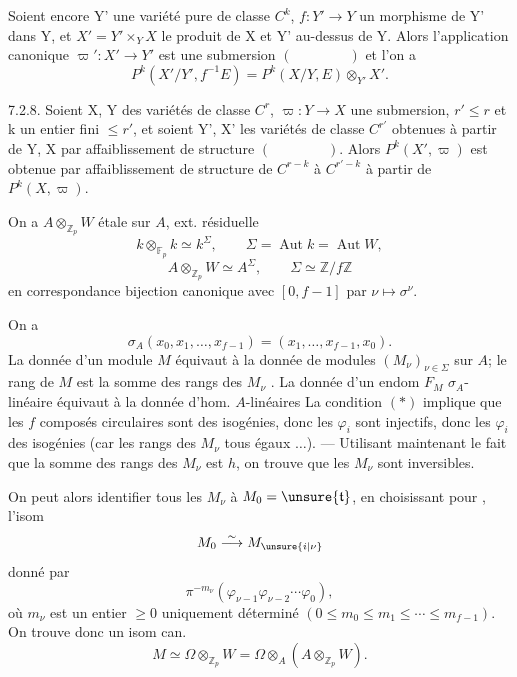 Soient encore Y' une variété pure de classe $C^k$, $f:Y'\longrightarrow Y$ un morphisme de Y' dans Y, et $X'=Y'\times_Y X$ le produit de X et Y' au-dessus de Y. Alors l'application canonique $\varpi':X'\longrightarrow Y'$ est une submersion $(\qquad\qquad)$ et l'on a
\[
P^k(X'/Y',f^{-1}E)=P^k(X/Y,E)\otimes_{Y'}X'.
\]

7.2.8. Soient X, Y des variétés de classe $C^r$, $\varpi:Y\longrightarrow X$ une submersion, $r'\leq r$ et k un entier fini $\leq r'$, et soient Y', X' les variétés de classe $C^{r'}$ obtenues à partir de Y, X par affaiblissement de structure $(\qquad\qquad)$. Alors $P^k(X',\varpi)$ est obtenue par affaiblissement de structure de $C^{r-k}$ à $C^{r'-k}$ à partir de $P^k(X,\varpi)$.

On a $A\otimes_{\mathbb Z_p}W$ étale sur $A$, ext. résiduelle
\[
k\otimes_{\mathbb F_p}k\simeq k^\Sigma,\qquad\Sigma=\operatorname{Aut}k=\operatorname{Aut}W,
\]
\[
A\otimes_{\mathbb Z_p}W\simeq A^\Sigma,\qquad \Sigma\simeq\mathbb Z/f\mathbb Z
\]
en correspondance bijection canonique avec $[0,f-1]$ par $\nu\mapsto\sigma^\nu$\quad{}.

On a
\[
\sigma_A(x_0,x_1,\ldots,x_{f-1})=(x_1,\ldots,x_{f-1},x_0).
\]
La donnée d'un module  $M$  équivaut à la donnée de modules $(M_\nu)_{\nu\in\Sigma}$ sur $A$; le rang de $M$ est la somme des rangs des $M_\nu$ . La donnée d'un endom $F_M$ $\sigma_A$-linéaire équivaut à la donnée d'hom. $A$-linéaires
La condition $(*)$  implique que les $f$ composés circulaires sont des isogénies, donc les $\varphi_i$ sont injectifs, donc les $\varphi_i$ des isogénies (car les rangs des $M_\nu$ tous égaux $\ldots$).  --- Utilisant maintenant le fait que la somme des rangs des $M_\nu$ est $h$, on trouve que les $M_\nu$ sont inversibles.

On peut alors identifier tous les $M_\nu$ à  $M_0=\unsure{\mathfrak t}$,  en choisissant  pour , l'isom 
\[
M_0\overset\sim\longrightarrow M_{\unsure{i|\nu}}
\]
donné par
\[
\pi^{-m_\nu}(\varphi_{\nu-1}\varphi_{\nu-2}\cdots\varphi_0),
\]
où $m_\nu$ est un entier $\geq0$ uniquement déterminé $(0\leq m_0\leq m_1\leq\cdots\leq m_{f-1})$. On trouve donc un isom can.
\[
M\simeq\Omega\otimes_{\mathbb Z_p}W=\Omega\otimes_A(A\otimes_{\mathbb Z_p}W).
\]

